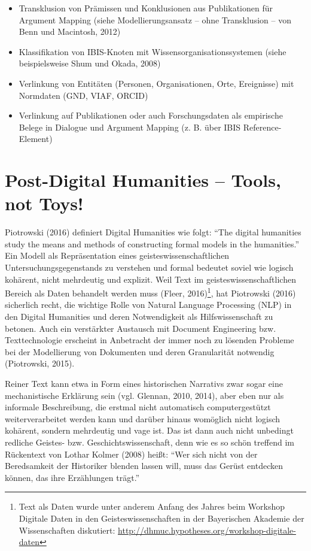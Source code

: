 \documentclass[a4paper,
fontsize=11pt,
oneside,
numbers=noperiodatend,
parskip=half-,
bibliography=totoc,
final
]{scrartcl}
\begin{document}
\begin{itemize}
\tightlist
\item
  Transklusion von Prämissen und Konklusionen aus Publikationen für
  Argument Mapping (siehe Modellierungsansatz -- ohne Transklusion --
  von Benn und Macintosh, 2012)
\item
  Klassifikation von IBIS-Knoten mit Wissensorganisationssystemen (siehe
  beispielsweise Shum und Okada, 2008)
\item
  Verlinkung von Entitäten (Personen, Organisationen, Orte, Ereignisse)
  mit Normdaten (GND, VIAF, ORCID)
\item
  Verlinkung auf Publikationen oder auch Forschungsdaten als empirische
  Belege in Dialogue und Argument Mapping (z. B. über IBIS
  Reference-Element)
\end{itemize}

\section*{Post-Digital Humanities -- Tools, not
Toys!}\label{post-digital-humanities-tools-not-toys}

Piotrowski (2016) definiert Digital Humanities wie folgt: \enquote{The
digital humanities study the means and methods of constructing formal
models in the humanities.} Ein Modell als Repräsentation eines
geisteswissenschaftlichen Untersuchungsgegenstands zu verstehen und
formal bedeutet soviel wie logisch kohärent, nicht mehrdeutig und
explizit. Weil Text im geisteswissenschaftlichen Bereich als Daten
behandelt werden muss (Fleer, 2016)\footnote{Text als Daten wurde unter
  anderem Anfang des Jahres beim Workshop Digitale Daten in den
  Geisteswissenschaften in der Bayerischen Akademie der Wissenschaften
  diskutiert: \url{http://dhmuc.hypotheses.org/workshop-digitale-daten}},
hat Piotrowski (2016) sicherlich recht, die wichtige Rolle von Natural
Language Processing (NLP) in den Digital Humanities und deren
Notwendigkeit als Hilfswissenschaft zu betonen. Auch ein verstärkter
Austausch mit Document Engineering bzw. Texttechnologie erscheint in
Anbetracht der immer noch zu lösenden Probleme bei der Modellierung von
Dokumenten und deren Granularität notwendig (Piotrowski, 2015).

Reiner Text kann etwa in Form eines historischen Narrativs zwar sogar
eine mechanistische Erklärung sein (vgl. Glennan, 2010, 2014), aber eben
nur als informale Beschreibung, die erstmal nicht automatisch
computergestützt weiterverarbeitet werden kann und darüber hinaus
womöglich nicht logisch kohärent, sondern mehrdeutig und vage ist. Das
ist dann auch nicht unbedingt redliche Geistes- bzw.
Geschichtswissenschaft, denn wie es so schön treffend im Rückentext von
Lothar Kolmer (2008) heißt: \enquote{Wer sich nicht von der Beredsamkeit
der Historiker blenden lassen will, muss das Gerüst entdecken können,
das ihre Erzählungen trägt.}
\end{document}
